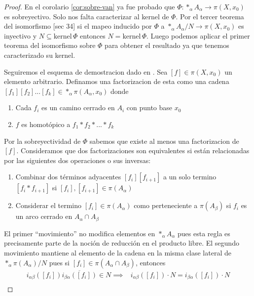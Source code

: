 \begin{proof}
  En el corolario \ref{cor:sobre-van} ya fue probado que \(\Phi :
  *_\alpha A_\alpha \to \pi (X, x_0)\) es sobreyectivo. Solo nos falta
  caracterizar al kernel de \(\Phi\). Por el tercer teorema del
  isomorfismo \cite{Fraleigh}[sec 34]
  si el mapeo inducido por \(\Phi\) a \(*_\alpha A_\alpha / N \to \pi (X,
  x_0)\) es inyectivo y \(N \subseteq \text{kernel}\, \Phi\) entonces \(N =
  \text{kernel} \, \Phi\). Luego podemos aplicar el primer teorema del
  isomorfismo sobre \(\Phi\) para obtener el resultado ya que tenemos
  caracterizado su kernel.

  Seguiremos el esquema de demostracion dado en \cite{Bloom}. Sea \([f]
  \in \pi (X, x_0)\) un elemento arbitrario. Definamos una factorizacion
  de esta como una cadena \([f_1][f_2] ... [f_k] \in *_\alpha \pi
  (A_\alpha, x_0)\) donde
  \begin{enumerate}
  \item Cada \(f_i\) es un camino cerrado en \(A_i\) con punto base \(x_0\)
  \item \(f\) es homotópico a \(f_1 * f_2 * ... * f_k\)
  \end{enumerate}
  Por la sobreyectividad de \(\Phi\) sabemos que existe al menos una
  factorizacion de \([f]\).
  Consideramos que dos factorizaciones son equivalentes si están
  relacionadas por las siguientes dos operaciones o sus inversas:
  \begin{enumerate}
  \item Combinar dos términos adyacentes \([f_i][f_{i+1}]\) a un solo
    termino \([f_i * f_{i+1}]\) si \([f_i],[f_{i+1}] \in \pi
    (A_\alpha)\)
  \item Considerar el termino \([f_i] \in \pi (A_\alpha)\) como
    perteneciente a \(\pi (A_\beta)\) si \(f_i\) es un arco cerrado en
    \(A_\alpha \cap A_\beta\)
  \end{enumerate}
  El primer ``movimiento'' no modifica elementos en \(*_\alpha
  A_\alpha\) pues esta regla es precisamente parte de la noción
  de reducción en el producto libre. El segundo movimiento mantiene al
  elemento de la cadena en la misma clase lateral de \(*_\alpha \pi
  (A_\alpha) / N\) pues si \([f_i] \in \pi (A_\alpha \cap A_\beta)\),
  entonces
  \begin{align*}
    i_{\alpha \beta} \left( [f_i] \right) \overline{i_{\beta \alpha}
      \left( [f_i] \right)} \in N \implies
    &i_{\alpha \beta} \left( [f_i] \right) \cdot N = i_{\beta \alpha}
    \left( [f_i] \right) \cdot N \\

\end{align*}
\end{proof}
